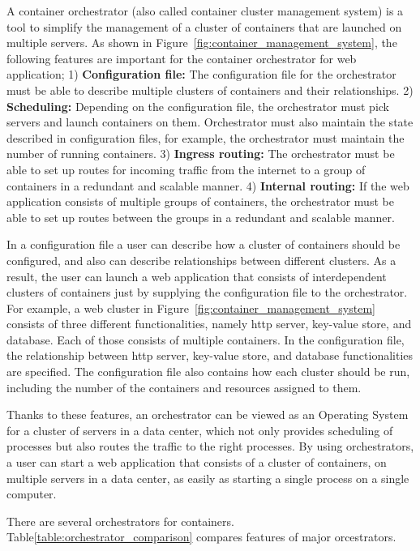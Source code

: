 A container orchestrator (also called container cluster management system) is a tool to simplify the management of a cluster of containers that are launched on multiple servers.
As shown in Figure~\ref{fig:container_management_system}, the following features are important for the container orchestrator for web application;
1) {\bf Configuration file:} The configuration file for the orchestrator must be able to describe multiple clusters of containers and their relationships.
2) {\bf Scheduling:} Depending on the configuration file, the orchestrator must pick servers and launch containers on them. Orchestrator must also maintain the state described in configuration files, for example, the orchestrator must maintain the number of running containers.
3) {\bf Ingress routing:} The orchestrator must be able to set up routes for incoming traffic from the internet to a group of containers in a redundant and scalable manner.
4) {\bf Internal routing:} If the web application consists of multiple groups of containers, the orchestrator must be able to set up routes between the groups in a redundant and scalable manner.

In a configuration file a user can describe how a cluster of containers should be configured, and also can describe relationships between different clusters.
As a result, the user can launch a web application that consists of interdependent clusters of containers just by supplying the configuration file to the orchestrator.
For example, a web cluster in Figure~\ref{fig:container_management_system} consists of three different functionalities, namely http server, key-value store, and database.
Each of those consists of multiple containers.
In the configuration file, the relationship between http server, key-value store, and database functionalities are specified.
The configuration file also contains how each cluster should be run, including the number of the containers and resources assigned to them.

Thanks to these features, an orchestrator can be viewed as an Operating System for a cluster of servers in a data center, which not only provides scheduling of processes but also routes the traffic to the right processes.
By using orchestrators, a user can start a web application that consists of a cluster of containers, on multiple servers in a data center, as easily as starting a single process on a single computer.

There are several orchestrators for containers. Table\ref{table:orchestrator_comparison} compares features of major orcestrators.

